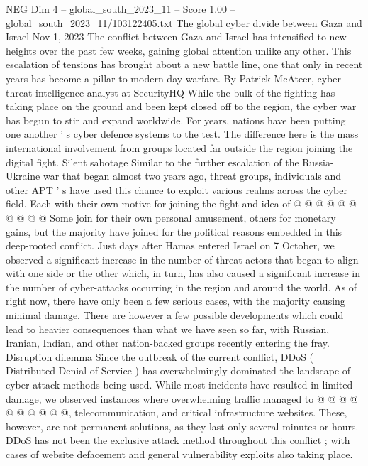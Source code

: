 \begin{textsample}{NEG Dim 4 – global\_south\_2023\_11 – Score 1.00 – global\_south\_2023\_11/103122405.txt}  \label{ex:f4_neg_292}
The global cyber divide between Gaza and Israel Nov 1, 2023 The conflict between Gaza and Israel has intensified to new heights over the past few weeks, gaining global attention unlike any other.
This escalation of tensions has brought about a new battle line, one that only in recent years has become a pillar to modern-day warfare.
By Patrick McAteer, cyber threat intelligence analyst at SecurityHQ While the bulk of the fighting has taking place on the ground and been kept closed off to the region, the cyber war has begun to stir and expand worldwide.
For years, nations have been putting one another ' s cyber defence systems to the test.
The difference here is the mass international involvement from groups located far outside the region joining the digital fight.
Silent sabotage Similar to the further escalation of the Russia-Ukraine war that began almost two years ago, threat groups, individuals and other APT ' s have used this chance to exploit various realms across the cyber field.
Each with their own motive for joining the fight and idea of @ @ @ @ @ @ @ @ @ @ Some join for their own personal amusement, others for monetary gains, but the majority have joined for the political reasons embedded in this deep-rooted conflict.
Just days after Hamas entered Israel on 7 October, we observed a significant increase in the number of threat actors that began to align with one side or the other which, in turn, has also caused a significant increase in the number of cyber-attacks occurring in the region and around the world.
As of right now, there have only been a few serious cases, with the majority causing minimal damage.
There are however a few possible developments which could lead to heavier consequences than what we have seen so far, with Russian, Iranian, Indian, and other nation-backed groups recently entering the fray.
Disruption dilemma Since the outbreak of the current conflict, DDoS ( Distributed Denial of Service ) has overwhelmingly dominated the landscape of cyber-attack methods being used.
While most incidents have resulted in limited damage, we observed instances where overwhelming traffic managed to @ @ @ @ @ @ @ @ @ @, telecommunication, and critical infrastructure websites.
These, however, are not permanent solutions, as they last only several minutes or hours.
DDoS has not been the exclusive attack method throughout this conflict ; with cases of website defacement and general vulnerability exploits also taking place.

\end{textsample}
